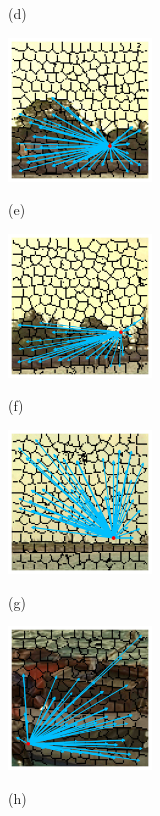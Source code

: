 \begin{figure}[]
\begin{minipage}[t]{.24\linewidth}
		\centerline{(d)}
	\end{minipage}
	\begin{minipage}[t]{.24\linewidth}
		\includegraphics[width=1.5in]{cropped/boat_superpixel_0.jpg}
		\centerline{(e)}
	\end{minipage}
	\begin{minipage}[t]{.24\linewidth}
		\includegraphics[width=1.5in]{cropped/boat_superpixel_1.jpg}
		\centerline{(f)}
	\end{minipage}
	\begin{minipage}[t]{.24\linewidth}
		\includegraphics[width=1.5in]{cropped/boat_superpixel_3.jpg}
		\centerline{(g)}
	\end{minipage}
	\begin{minipage}[t]{.24\linewidth}
		\includegraphics[width=1.5in]{cropped/boat_superpixel_9.jpg}
		\centerline{(h)}
	\end{minipage}
	\begin{minipage}[t]{.24\linewidth}

\end{minipage}
\end{figure}
